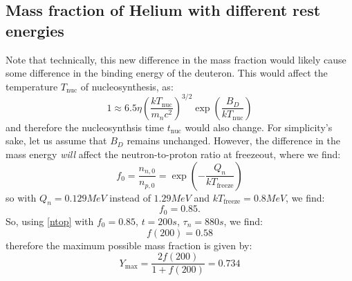 \subsection{Mass fraction of Helium with different rest energies}
Note that technically, this new difference in the mass fraction would likely cause some difference in the binding energy of the deuteron. This would affect the temperature $T_{\text{nuc}}$ of nucleosynthesis, as:
\begin{equation}
    1 \approx 6.5\eta\left(\frac{kT_{\text{nuc}}}{m_n c^2}\right)^{3/2}\exp(\frac{B_{D}}{kT_{\text{nuc}}})
\end{equation}
and therefore the nucleosynthsis time $t_{\text{nuc}}$ would also change. For simplicity's sake, let us assume that $B_D$ remains unchanged. However, the difference in the mass energy \emph{will} affect the neutron-to-proton ratio at freezeout, where we find:
\begin{equation}
    f_0 = \frac{n_{n, 0}}{n_{p, 0}} = \exp(-\frac{Q_{n}}{kT_{\text{freeze}}})
\end{equation}
so with $Q_{n} = 0.129\si{MeV}$ instead of $1.29\si{MeV}$ and $kT_{\text{freeze}} = 0.8\si{MeV}$, we find:
\begin{equation}
    f_0 = 0.85.
\end{equation}
So, using \eqref{ntop} with $f_0 = 0.85$, $t = 200\si{s}$, $\tau_n = 880\si{s}$, we find:
\begin{equation}
    f(200) = 0.58
\end{equation}
therefore the maximum possible mass fraction is given by:
\begin{equation}
    \boxed{Y_{\text{max}} = \frac{2f(200)}{1 + f(200)} = 0.734}
\end{equation}


